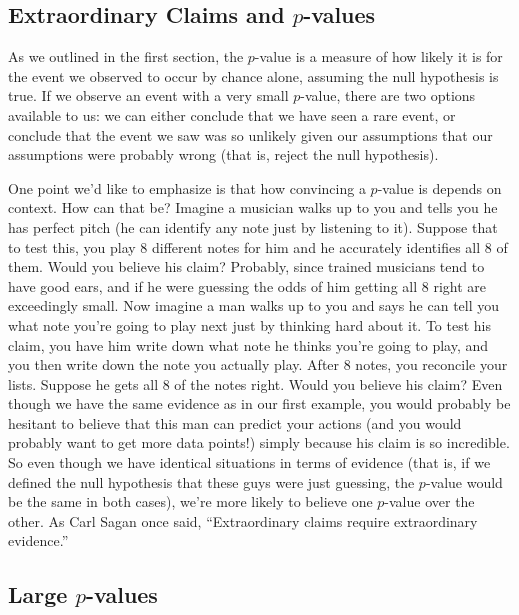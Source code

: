 \subsection{Extraordinary Claims and $p$-values}

As we outlined in the first section, the $p$-value is a measure of how likely it is for the event we observed to occur by chance alone, assuming the null hypothesis is true. If we observe an event with a very small $p$-value, there are two options available to us: we can either conclude that we have seen a rare event, or conclude that the event we saw was so unlikely given our assumptions that our assumptions were probably wrong (that is, reject the null hypothesis).

One point we'd like to emphasize is that how convincing a $p$-value is depends on context. How can that be? Imagine a musician walks up to you and tells you he has perfect pitch (he can identify any note just by listening to it). Suppose that to test this, you play 8 different notes for him and he accurately identifies all 8 of them. Would you believe his claim? Probably, since trained musicians tend to have good ears, and if he were guessing the odds of him getting all 8 right are exceedingly small. Now imagine a man walks up to you and says he can tell you what note you're going to play next just by thinking hard about it. To test his claim, you have him write down what note he thinks you're going to play, and you then write down the note you actually play. After 8 notes, you reconcile your lists. Suppose he gets all 8 of the notes right. Would you believe his claim? Even though we have the same evidence as in our first example, you would probably be hesitant to believe that this man can predict your actions (and you would probably want to get more data points!) simply because his claim is so incredible. So even though we have identical situations in terms of evidence (that is, if we defined the null hypothesis that these guys were just guessing, the $p$-value would be the same in both cases), we're more likely to believe one $p$-value over the other. As Carl Sagan once said, ``Extraordinary claims require extraordinary evidence.''


\subsection{Large $p$-values}

